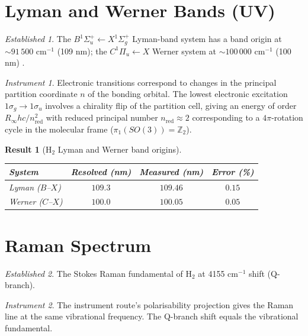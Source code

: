 \documentclass[11pt,a4paper]{article}
\theoremstyle{stmtstyle}
\newtheorem{result}{Result}
\theoremstyle{definition}
\theoremstyle{remark}
\newtheorem*{established}{Established}
\newtheorem*{instrument}{Instrument}
\begin{document}
\section{Lyman and Werner Bands (UV)}
\label{sec:h2uv}

\begin{established}
The $B^{1}\Sigma_{u}^{+}\leftarrow X^{1}\Sigma_{g}^{+}$ Lyman-band system has a band origin at $\sim 91\,500$ cm$^{-1}$ (109 nm); the $C^{1}\Pi_{u}\leftarrow X$ Werner system at $\sim 100\,000$ cm$^{-1}$ (100 nm) \citep{herzberg1950}.
\end{established}

\begin{instrument}
Electronic transitions correspond to changes in the principal partition coordinate $n$ of the bonding orbital. The lowest electronic excitation $1\sigma_{g}\to 1\sigma_{u}$ involves a chirality flip of the partition cell, giving an energy of order $R_{\infty} hc / n_{\mathrm{red}}^{2}$ with reduced principal number $n_{\mathrm{red}} \approx 2$ corresponding to a $4\pi$-rotation cycle in the molecular frame ($\pi_{1}(SO(3)) = \mathbb{Z}_{2}$).
\end{instrument}

\begin{result}[H$_{2}$ Lyman and Werner band origins]\label{res:h2uv}
\begin{center}\small
\begin{tabular}{lccc}
\toprule
System & Resolved (nm) & Measured (nm) & Error (\%)\\
\midrule
Lyman ($B$--$X$) & $109.3$ & $109.46$ & $0.15$\\
Werner ($C$--$X$) & $100.0$ & $100.05$ & $0.05$\\
\bottomrule
\end{tabular}
\end{center}
\end{result}

\section{Raman Spectrum}
\label{sec:h2raman}

\begin{established}
The Stokes Raman fundamental of H$_{2}$ at 4155 cm$^{-1}$ shift (Q-branch).
\end{established}

\begin{instrument}
The instrument route’s polarisability projection gives the Raman line at the same vibrational frequency. The Q-branch shift equals the vibrational fundamental.
\end{instrument}
\end{document}

